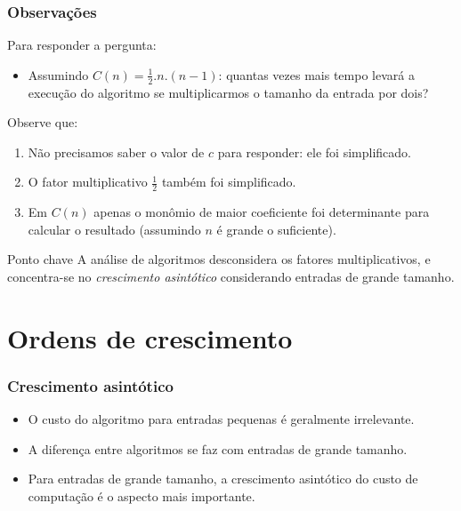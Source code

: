 \documentclass{beamer}
\begin{document}
\begin{frame}
  \frametitle{Observações}

  Para responder a pergunta:
  \begin{itemize}
  \item Assumindo $C(n) = \frac{1}{2}.n.(n-1)$: quantas vezes mais tempo levará
    a execução do algoritmo se multiplicarmos o tamanho da entrada por dois?
  \end{itemize}
  \pause
  Observe que:
  \begin{enumerate}
  \item Não precisamos saber o valor de $c$ para responder: ele foi
    simplificado.
  \item O fator multiplicativo $\frac{1}{2}$ também foi simplificado.
  \item Em $C(n)$ apenas o monômio de maior coeficiente foi determinante para
    calcular o resultado (assumindo $n$ é grande o suficiente).
  \end{enumerate}
  \begin{block}{Ponto chave}
    A análise de algoritmos desconsidera os fatores multiplicativos, e
    concentra-se no \emph{crescimento asintótico} considerando entradas de
    grande tamanho.
  \end{block}
\end{frame}

\section{Ordens de crescimento}

\begin{frame}
\frametitle{Crescimento asintótico}

\begin{itemize}
  \item O custo do algoritmo para entradas pequenas é geralmente irrelevante.
  \item A diferença entre algoritmos se faz com entradas de grande tamanho.
  \item Para entradas de grande tamanho, a crescimento asintótico do custo
    de computação é o aspecto mais importante.
\end{itemize}
\end{frame}
\end{document}
